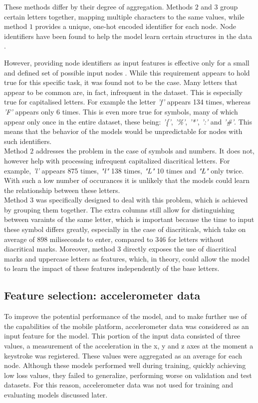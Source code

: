 These methods differ by their degree of aggregation. Methods $2$ and $3$ group certain letters together, mapping multiple characters to the same values, while method $1$ provides a unique, one-hot encoded identifier for each node. Node identifiers have been found to help the model learn certain structures in the data \cite{you2021identityawaregraphneuralnetworks}. 

However, providing node identifiers as input features is effective only for a small and defined set of possible input nodes \cite{Lesk2024}. While this requirement appears to hold true for this specific task, it was found not to be the case.
Many letters that appear to be common are, in fact, infrequent in the dataset. This is especially true for capitalised letters. For example the letter \textit{'f'} appears 134 times, whereas \textit{'F'} appears only 6 times. This is even more true for symbols, many of which appear only once in the entire dataset, these being: \textit{'\{'}, \textit{'\%'}, \textit{'*'}, \textit{':'} and \textit{'\#'}.
This means that the behavior of the models would be unpredictable for nodes with such identifiers.\\
Method $2$ addresses the problem in the case of symbols and numbers. It does not, however help with processing infrequent capitalized diacritical letters. For example, \textit{'l'} appears 875 times, \textit{"ł"} 138 times, \textit{"L"} 10 times and \textit{"Ł"} only twice. With such a low number of occurances it is unlikely that the models could learn the relationship between these letters. \\
Method $3$ was specifically designed to deal with this problem, which is achieved by grouping them together. The extra columns still allow for distinguishing between varaints of the same letter, which is important because the time to input these symbol differs greatly, especially in the case of diacriticals, which take on average of 898 miliseconds to enter, compared to 346 for letters without diacritical marks.
Moreover, method $3$ directly exposes the use of diacritical marks and uppercase letters as features, which, in theory, could allow the model to learn the impact of these features independently of the base letters. 

\subsection{Feature selection: accelerometer data} \label{accel_subsection}
To improve the potential performance of the model, and to make further use of the capabilities of the mobile platform, accelerometer data was considered as an input feature for the model. %
This portion of the input data consisted of three values, a measurement of the acceleration in the x, y and z axes at the moment a keystroke was registered. 
These values were aggregated as an average for each node. Although these models performed well during training, quickly achieving low loss values, they failed to generalize, performing worse on validation and test datasets. For this reason, accelerometer data was not used for training and evaluating models discussed later.

